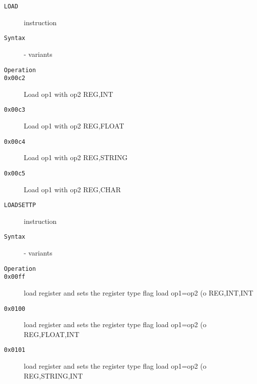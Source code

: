 \begin{description}
\item[\texttt{LOAD}] instruction\\
\item[\texttt{Syntax}] - variants\\

\item[\texttt{Operation}]
\item[\texttt{}]
\item[\texttt{0x00c2}] Load op1 with op2  {REG,INT}           \\
\item[\texttt{0x00c3}] Load op1 with op2  {REG,FLOAT}         \\
\item[\texttt{0x00c4}] Load op1 with op2  {REG,STRING}        \\
\item[\texttt{0x00c5}] Load op1 with op2  {REG,CHAR}          \\
\end{description}
\clearpage
\begin{description}
\item[\texttt{LOADSETTP}] instruction\\
\item[\texttt{Syntax}] - variants\\

\item[\texttt{Operation}]
\item[\texttt{}]
\item[\texttt{0x00ff}] load register and sets the register type flag load op1=op2 (o  {REG,INT,INT}       \\
\item[\texttt{0x0100}] load register and sets the register type flag load op1=op2 (o  {REG,FLOAT,INT}     \\
\item[\texttt{0x0101}] load register and sets the register type flag load op1=op2 (o  {REG,STRING,INT}    \\
\end{description}
